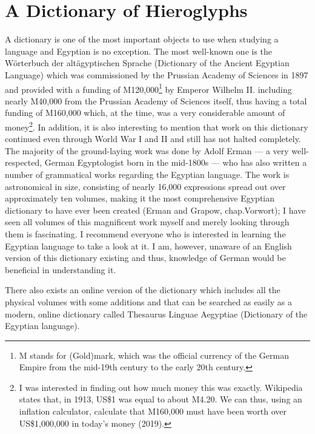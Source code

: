 \chapter*{A Dictionary of Hieroglyphs}
A dictionary is one of the most important objects to use when studying a language and Egyptian is no exception. The most well-known one is the Wörterbuch der altägyptischen Sprache (Dictionary of the Ancient Egyptian Language) which was commissioned by the Prussian Academy of Sciences in 1897 and provided with a funding of M120,000\footnote{M stands for (Gold)mark, which was the official currency of the German Empire from the mid-19th century to the early 20th century.} by Emperor Wilhelm II. including nearly M40,000 from the Prussian Academy of Sciences itself, thus having a total funding of M160,000 which, at the time, was a very considerable amount of money\footnote{I was interested in finding out how much money this was exactly. Wikipedia states that, in 1913, US\$1 was equal to about M4.20. We can thus, using an inflation calculator, calculate that M160,000 must have been worth over US\$1,000,000 in today’s money (2019).}. In addition, it is also interesting to mention that work on this dictionary continued even through World War I and II and still has not halted completely. The majority of the ground-laying work was done by Adolf Erman — a very well-respected, German Egyptologist born in the mid-1800s — who has also written a number of grammatical works regarding the Egyptian language. The work is astronomical in size, consisting of nearly 16,000 expressions spread out over approximately ten volumes, making it the most comprehensive Egyptian dictionary to have ever been created (Erman and Grapow, chap.Vorwort); I have seen all volumes of this magnificent work myself and merely looking through them is fascinating. I recommend everyone who is interested in learning the Egyptian language to take a look at it. I am, however, unaware of an English version of this dictionary existing and thus, knowledge of German would be beneficial in understanding it.

There also exists an online version of the dictionary which includes all the physical volumes with some additions and that can be searched as easily as a modern, online dictionary called Thesaurus Linguae Aegyptiae (Dictionary of the Egyptian language).

